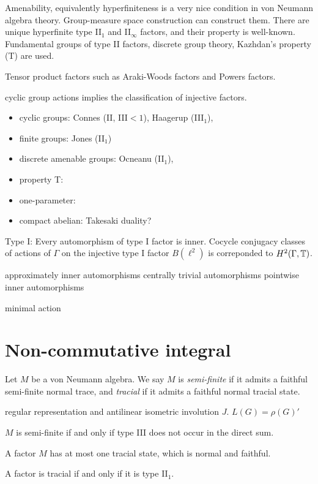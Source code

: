 \documentclass{../../large}
\begin{document}
Amenability, equivalently hyperfiniteness is a very nice condition in von Neumann algebra theory.
Group-measure space construction can construct them.
There are unique hyperfinite type II$_1$ and II$_\infty$ factors, and their property is well-known.
Fundamental groups of type II factors, discrete group theory, Kazhdan's property (T) are used.

Tensor product factors such as Araki-Woods factors and Powers factors.








cyclic group actions implies the classification of injective factors.

\begin{itemize}
\item cyclic groups: Connes (II, III$<1$), Haagerup (III$_1$),
\item finite groups: Jones (II$_1$)
\item discrete amenable groups: Ocneanu (II$_1$), 
\item property T:
\item one-parameter:
\item compact abelian: Takesaki duality?
\end{itemize}

Type I:
Every automorphism of type I factor is inner.
Cocycle conjugacy classes of actions of $\Gamma$ on the injective type I factor $B(\ell^2)$ is correponded to $H^2(\Gamma,\mathbb{T})$.

approximately inner automorphisms
centrally trivial automorphisms
pointwise inner automorphisms

minimal action






\chapter{Non-commutative integral}



\begin{prb}
Let $M$ be a von Neumann algebra.
We say $M$ is \emph{semi-finite} if it admits a faithful semi-finite normal trace, and \emph{tracial} if it admits a faithful normal tracial state.
\begin{parts}
\item regular representation and antilinear isometric involution $J$. $L(G)=\rho(G)'$
\item $M$ is semi-finite if and only if type III does not occur in the direct sum.

\item A factor $M$ has at most one tracial state, which is normal and faithful.
\item A factor is tracial if and only if it is type II$_1$.
\end{parts}
\end{prb}
\end{document}
